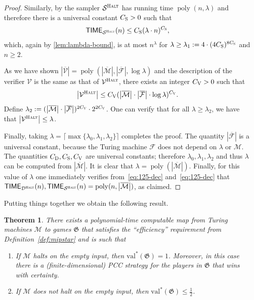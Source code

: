\documentclass[11pt]{article}
\newtheorem{theorem}{Theorem}[section]
\theoremstyle{definition}
\DeclareMathOperator{\poly}{poly}
\newcommand{\val}{\ensuremath{\mathrm{val}}}
\newcommand{\abs}[1]{\left\vert {#1} \right\vert}
\newcommand{\game}{\mathfrak{G}}
\newcommand{\sampler}{\mathcal{S}}
\newcommand{\decider}{\mathcal{D}}
\newcommand{\verifier}{\mathcal{V}}
\newcommand{\labelstyle}[1]{\ensuremath{\textsc{#1}}\xspace}
\newcommand{\halt}{\textsc{Halt}}
\newcommand{\machine}{\cal{M}}
\renewcommand{\cal}[1]{\mathcal{#1}}
\newcommand{\TIME}{\mathsf{TIME}}
\begin{document}
\begin{proof}
  Similarly, by  the sampler $\sampler^\halt$ has running time $\poly(n, \lambda)$
  and therefore there is a universal constant $C_{\labelstyle{S}}>0$ such that
  \begin{equation}\label{eq:125-samp}
    \TIME_{\sampler^\halt}(n) \le C_{\labelstyle{S}}(\lambda \cdot n)^{C_{\labelstyle{S}}},
  \end{equation}
  which, again by \cref{lem:lambda-bound}, is at most $n^\lambda$ for $\lambda
  \ge \lambda_1 := 4 \cdot (4C_{\labelstyle{S}})^{8C_{\labelstyle{S}}}$ and $n \ge 2$.

  As we have shown $\abs{\overline{\verifier}} = \poly(\abs{\overline{\cal{M}}}, \abs{\overline{\cal{F}}}, \log
  \lambda)$ and the description of the verifier $\verifier$ is the same as that
  of $\verifier^\halt$, there exists an integer $C_{\labelstyle{V}}>0$ such that
  \begin{equation*}
    \abs{\verifier^\halt} \le C_{\labelstyle{V}}(\abs{\overline{\cal{M}}} \cdot \abs{\overline{\cal{F}}} \cdot \log
    \lambda)^{C_{\labelstyle{V}}}.
  \end{equation*}
  Define $\lambda_2 := (\abs{\overline{\cal{M}}} \cdot \abs{\overline{\cal{F}}})^{2 C_{\labelstyle{V}}} \cdot 2^{2 C_{\labelstyle{V}}}$. One can verify that 
  for all $\lambda \geq \lambda_2$, we have that $\abs{\verifier^\halt}  \leq \lambda$.

  Finally, taking $\lambda = \big\lceil\max\{\lambda_0,\lambda_1,\lambda_2 \} \big \rceil$ completes the proof.
	The quantity $\abs{\overline{\cal{F}}}$ is a universal constant, because the Turing machine $\cal{F}$ does not depend on $\lambda$ or $\cal{M}$. The quantities $	C_{\labelstyle{D}}, C_{\labelstyle{S}}, C_{\labelstyle{V}}$ are universal constants; therefore $\lambda_0, \lambda_1, \lambda_2$ and thus $\lambda$ can be computed from $|\overline{\machine}|$. It is clear that $\lambda = \poly(|\overline{\machine}|)$. Finally, for this value of $\lambda$ one immediately verifies from~\eqref{eq:125-dec} and~\eqref{eq:125-dec} that $\TIME_{\decider^\halt}(n),\TIME_{\sampler^\halt}(n) = \poly(n, \abs{\overline{\cal{M}}})$, as claimed. 
	
\end{proof}


Putting things together we obtain the following result. 

\begin{theorem}
  \label{thm:halting}
  There exists a polynomial-time computable map from Turing machines $\machine$ to games $\game$ that satisfies the ``efficiency'' requirement from Definition~\ref{def:mipstar} and is
	such that
	\begin{enumerate}
  \item If $\machine$ halts on the empty input, then $\val^*(\game) = 1$. Moreover, in this case there is a (finite-dimensional) PCC strategy for the players in $\game$ that wins with certainty. 
  \item If $\machine$ does not halt on the empty input, then $\val^*(\game) \leq
    \frac{1}{2}$.
	\end{enumerate}
\end{theorem}
\end{document}
